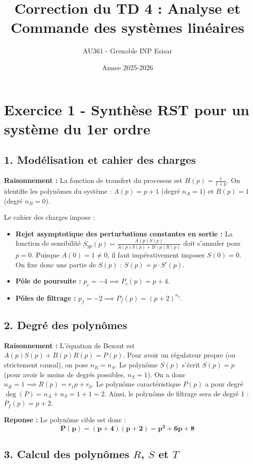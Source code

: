 \documentclass[11pt,a4paper]{article}
\title{Correction du TD 4 : Analyse et Commande des systèmes linéaires}
\author{AU361 - Grenoble INP Esisar}
\date{Annee 2025-2026}
\begin{document}
\maketitle

\section*{Exercice 1 - Synthèse RST pour un système du 1er ordre}

\subsection*{1. Modélisation et cahier des charges}

\textbf{Raisonnement :} La fonction de transfert du processus est $H(p) = \frac{1}{1+p}$.
On identifie les polynômes du système : $A(p) = p+1$ (degré $n_A=1$) et $B(p) = 1$ (degré $n_B=0$).

Le cahier des charges impose :
\begin{itemize}
    \item \textbf{Rejet asymptotique des perturbations constantes en sortie :} La fonction de sensibilité $S_{yp}(p) = \frac{A(p)S(p)}{A(p)S(p)+B(p)R(p)}$ doit s'annuler pour $p=0$. Puisque $A(0) = 1 \neq 0$, il faut impérativement imposer $S(0)=0$. On fixe donc une partie de $S(p)$ : $S(p) = p \cdot S'(p)$.
    \item \textbf{Pôle de poursuite :} $p_c = -4 \implies P_c(p) = p+4$.
    \item \textbf{Pôles de filtrage :} $p_f = -2 \implies P_f(p) = (p+2)^{n_f}$.
\end{itemize}

\subsection*{2. Degré des polynômes}

\textbf{Raisonnement :} L'équation de Bezout est $A(p)S(p) + B(p)R(p) = P(p)$.
Pour avoir un régulateur propre (ou strictement causal), on pose $n_R = n_S$.
Le polynôme $S(p)$ s'écrit $S(p) = p$ (pour avoir le moins de degrés possibles, $n_S=1$).
On a donc $n_R = 1 \implies R(p) = r_1 p + r_0$.
Le polynôme caractéristique $P(p)$ a pour degré $\deg(P) = n_A + n_S = 1+1=2$.
Ainsi, le polynôme de filtrage sera de degré 1 : $P_f(p) = p+2$.

\textbf{Reponse :} Le polynôme cible est donc :
$$ 
\mathbf{P(p) = (p+4)(p+2) = p^2 + 6p + 8} 
$$

\subsection*{3. Calcul des polynômes $R$, $S$ et $T$}
\end{document}
